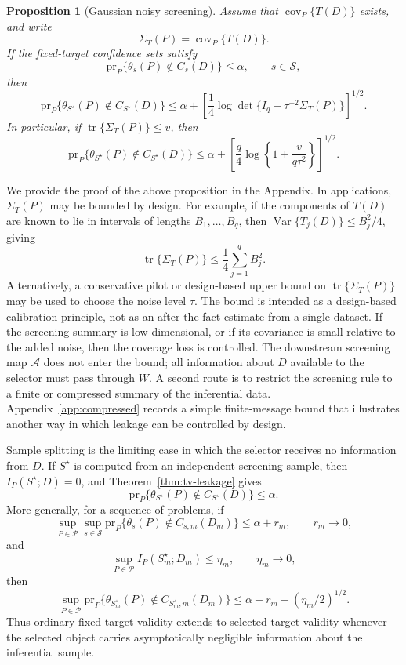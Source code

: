 \documentclass[11pt]{article}
\newtheorem{proposition}{Proposition}
\newcommand{\calA}{\mathcal A}
\newcommand{\calS}{\mathcal S}
\newcommand{\calP}{\mathcal P}
\begin{document}
\begin{proposition}[Gaussian noisy screening]
	\label{prop:gaussian-noisy-screening}
	Assume that \(\operatorname{cov}_P\{T(D)\}\) exists, and write
	\[
	\Sigma_T(P)=\operatorname{cov}_P\{T(D)\}.
	\]
	If the fixed-target confidence sets satisfy
	\[
	\mathrm{pr}_P\{\theta_s(P)\notin C_s(D)\}\leq \alpha,
	\qquad s\in\calS ,
	\]
	then
	\[
	\mathrm{pr}_P\{\theta_{S^\star}(P)\notin C_{S^\star}(D)\}
	\leq
	\alpha+
	\left[
	\frac14
	\log\det\{I_q+\tau^{-2}\Sigma_T(P)\}
	\right]^{1/2}.
	\]
	In particular, if \(\operatorname{tr}\{\Sigma_T(P)\}\leq v\), then
	\[
	\mathrm{pr}_P\{\theta_{S^\star}(P)\notin C_{S^\star}(D)\}
	\leq
	\alpha+
	\left[
	\frac{q}{4}
	\log\left\{1+\frac{v}{q\tau^2}\right\}
	\right]^{1/2}.
	\]
\end{proposition}



We provide the proof of the above proposition in the Appendix. In applications, \(\Sigma_T(P)\) may be bounded by design. For example, if the components of \(T(D)\) are known to lie in intervals of lengths \(B_1,\ldots,B_q\), then \(\operatorname{Var}\{T_j(D)\}\leq B_j^2/4\), giving
\[
\operatorname{tr}\{\Sigma_T(P)\}
\leq
\frac14\sum_{j=1}^q B_j^2 .
\]
Alternatively, a conservative pilot or design-based upper bound on
\(\operatorname{tr}\{\Sigma_T(P)\}\) may be used to choose the noise level \(\tau\). The bound is intended as a design-based calibration principle, not as an after-the-fact estimate from a single dataset. If the screening summary is low-dimensional, or if its covariance is small relative to the added noise, then the coverage loss is controlled. The downstream screening map \(\calA\) does not enter the bound; all information about \(D\) available to the selector must pass
through \(W\). A second route is to restrict the screening rule to a finite or compressed summary of the inferential data. Appendix~\ref{app:compressed} records a simple finite-message bound that illustrates another way in which leakage can be controlled by design.

Sample splitting is the limiting case in which the selector receives no
information from \(D\). If \(S^\star\) is computed from an independent screening sample, then \(I_P(S^\star;D)=0\), and Theorem~\ref{thm:tv-leakage} gives
\[
\mathrm{pr}_P\{\theta_{S^\star}(P)\notin C_{S^\star}(D)\}\leq \alpha.
\]
More generally, for a sequence of problems, if
\[
\sup_{P\in\calP}\sup_{s\in\calS}
\mathrm{pr}_P\{\theta_s(P)\notin C_{s,m}(D_m)\}
\leq \alpha+r_m,
\qquad r_m\to0,
\]
and
\[
\sup_{P\in\calP}I_P(S_m^\star;D_m)\leq \eta_m,
\qquad \eta_m\to0,
\]
then
\[
\sup_{P\in\calP}
\mathrm{pr}_P\{\theta_{S_m^\star}(P)\notin C_{S_m^\star,m}(D_m)\}
\leq
\alpha+r_m+(\eta_m/2)^{1/2}.
\]
Thus ordinary fixed-target validity extends to selected-target validity whenever the selected object carries asymptotically negligible information about the inferential sample. 
\end{document}
